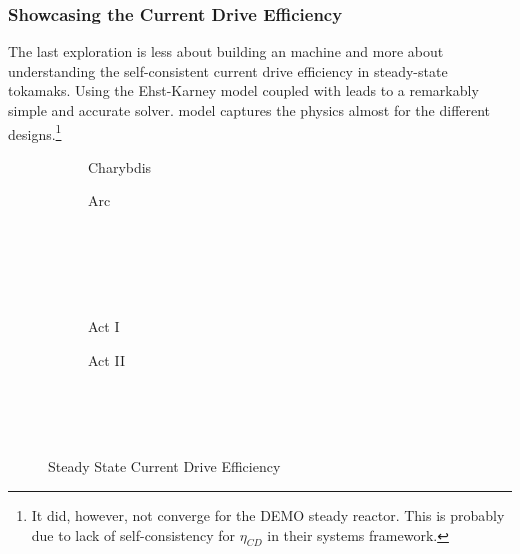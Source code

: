 \subsubsection{Showcasing the Current Drive Efficiency}

The last exploration is less about building an  machine and more about understanding the self-consistent current drive efficiency in steady-state tokamaks. Using the Ehst-Karney model \cite{ehstkarney} coupled with \cite{jeff} leads to a remarkably simple and accurate solver.  model captures the physics almost  for the different designs.\footnote{ It did, however, not converge for the DEMO steady reactor. This is probably due to lack of self-consistency for $\eta_{CD}$ in their systems framework. }

\begin{figure*}
    \centering
    \hfill 
    \begin{subfigure}[t]{0.45\textwidth}
        \centering
		\begin{adjustbox}{width=\textwidth}
			\Large
			
		\end{adjustbox}
        \caption{Charybdis}
    \end{subfigure}
    \hfill
    \begin{subfigure}[t]{0.45\textwidth}
        \centering
		\begin{adjustbox}{width=\textwidth}
			\Large
			
		\end{adjustbox}
        \caption{Arc}
    \end{subfigure}
    \hfill \hfill ~\\ ~\\ ~\\ ~\\
    \hfill 
    \begin{subfigure}[t]{0.45\textwidth}
        \centering
		\begin{adjustbox}{width=\textwidth}
			\Large
			
		\end{adjustbox}
        \caption{Act I}
    \end{subfigure}
    \hfill
    \begin{subfigure}[t]{0.45\textwidth}
        \centering
		\begin{adjustbox}{width=\textwidth}
			\Large
			
		\end{adjustbox}
        \caption{Act II}
    \end{subfigure}
    \hfill \hfill ~\\ ~\\ ~\\
    \caption{Steady State Current Drive Efficiency}
    \label{fig:steady_eta_CD}
\end{figure*}

